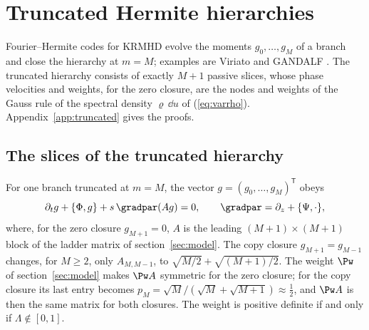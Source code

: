 \section{Truncated Hermite hierarchies}\label{sec:truncated}

Fourier--Hermite codes for KRMHD evolve the moments $g_0,\dots,g_M$ of a branch and close the hierarchy at $m=M$; examples are Viriato \citep{Loureiro2016} and GANDALF \citep{Kanekar2025}. The truncated hierarchy consists of exactly $M+1$ passive slices, whose phase velocities and weights, for the zero closure, are the nodes and weights of the Gauss rule of the spectral density $\varrho\,\dd u$ of (\ref{eq:varrho}). Appendix~\ref{app:truncated} gives the proofs.

\subsection{The slices of the truncated hierarchy}

For one branch truncated at $m=M$, the vector $g=(g_0,\dots,g_M)^{\mathsf T}$ obeys
\begin{equation}\label{tr:hierarchy}
  \partial_tg+\{\Phi,g\}+s\,\gradpar(Ag)=0,\qquad \gradpar=\partial_z+\{\Psi,\cdot\},
\end{equation}
where, for the zero closure $g_{M+1}=0$, $A$ is the leading $(M+1)\times(M+1)$ block of the ladder matrix of section~\ref{sec:model}. The copy closure $g_{M+1}=g_{M-1}$ changes, for $M\ge2$, only $A_{M,M-1}$, to $\sqrt{M/2}+\sqrt{(M+1)/2}$. The weight $\Pw$ of section~\ref{sec:model} makes $\Pw A$ symmetric for the zero closure; for the copy closure its last entry becomes $p_M=\sqrt M/(\sqrt M+\sqrt{M+1})\approx\frac12$, and $\Pw A$ is then the same matrix for both closures. The weight is positive definite if and only if $\Lambda\notin[0,1]$.

